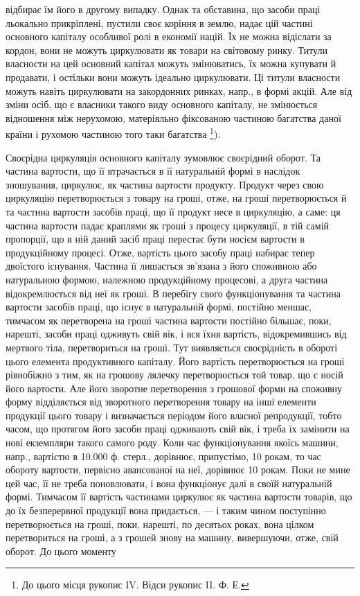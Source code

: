 \parcont{}  %
відбирає їм його в другому випадку. Однак та обставина, що засоби праці льокально прикріплені,
пустили своє коріння в землю, надає цій частині основного капіталу особливої ролі в економії націй.
Їх не можна відіслати за кордон, вони не можуть циркулювати як товари на світовому ринку. Титули
власности на цей основний капітал можуть змінюватись, їх можна купувати й продавати, і остільки вони
можуть ідеально
циркулювати. Ці титули власности можуть навіть циркулювати на закордонних ринках, напр., в формі
акцій. Але від зміни осіб, що є власники такого виду основного капіталу, не змінюється відношення
між нерухомою, матеріяльно фіксованою частиною багатства даної країни і рухомою частиною того таки
багатства \footnote{До цього місця рукопис IV. Відси рукопис II. Ф. Е.}).

Своєрідна циркуляція основного капіталу зумовлює своєрідний оборот. Та частина вартости, що її
втрачається в її натуральній формі в наслідок зношування, циркулює, як частина вартости продукту.
Продукт через свою циркуляцію перетворюється з товару на гроші, отже, на гроші перетворюється й та
частина вартости засобів праці, що її продукт несе в циркуляцію, а саме: ця частина вартости падає
краплями як гроші з процесу циркуляції, в тій самій пропорції, що в ній даний засіб праці перестає
бути носієм вартости в продукційному процесі. Отже, вартість цього засобу праці набирає тепер
двоїстого існування. Частина її лишається зв’язана з його споживною або натуральною формою, належною
продукційному процесові, а друга частина відокремлюється від неї як гроші. В перебігу свого
функціонування та частина вартости засобів праці, що існує в натуральній формі, постійно меншає,
тимчасом як перетворена на гроші частина вартости постійно більшає, поки, нарешті, засоби праці
одживуть свій вік, і вся їхня вартість, відокремившись від мертвого тіла, перетвориться на гроші.
Тут виявляється своєрідність в обороті цього елемента продуктивного капіталу. Його вартість
перетворюється на гроші рівнобіжно з тим, як на грошову лялечку перетворюється той товар, що є носій
його вартости. Але його зворотне перетворення з грошової форми на споживну форму відділяється від
зворотного перетворення товару на інші елементи продукції цього товару і визначається періодом його
власної репродукції, тобто часом, що протягом його засоби праці одживають свій вік, і треба їх
замінити на нові екземпляри такого самого роду. Коли час функціонування якоїсь машини, напр.,
вартістю в 10.000 ф. стерл., дорівнює, припустімо, 10 рокам, то час обороту вартости, первісно
авансованої на неї, дорівнює 10 рокам. Поки не мине цей час, її не треба поновлювати, і вона
функціонує далі в своїй натуральній формі. Тимчасом її вартість частинами циркулює як частина
вартости товарів, що до їх безперервної продукції вона придається, — і таким чином поступінно
перетворюється на гроші, поки, нарешті, по десятьох роках, вона цілком перетвориться на гроші, а з
грошей знову на машину, вивершуючи, отже, свій оборот. До цього моменту
\parbreak{}  %
